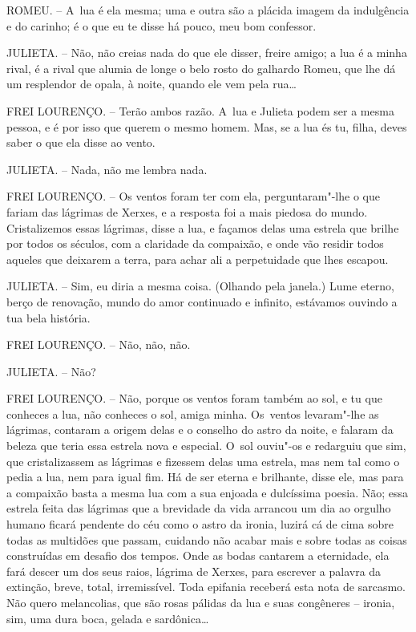 ROMEU. -- A~lua é ela mesma; uma e outra são a plácida imagem da
indulgência e do carinho; é o que eu te disse há pouco, meu bom
confessor.

JULIETA. -- Não, não creias nada do que ele disser, freire amigo; a lua
é a minha rival, é a rival que alumia de longe o belo rosto do galhardo
Romeu, que lhe dá um resplendor de opala, à noite, quando ele vem pela
rua\ldots{}

FREI LOURENÇO. -- Terão ambos razão. A~lua e Julieta podem ser a mesma
pessoa, e é por isso que querem o mesmo homem. Mas, se a lua és tu,
filha, deves saber o que ela disse ao vento.

JULIETA. -- Nada, não me lembra nada.

FREI LOURENÇO. -- Os ventos foram ter com ela, perguntaram"-lhe o que
fariam das lágrimas de Xerxes, e a resposta foi a mais piedosa do mundo.
Cristalizemos essas lágrimas, disse a lua, e façamos delas uma estrela
que brilhe por todos os séculos, com a claridade da compaixão, e onde
vão residir todos aqueles que deixarem a terra, para achar ali a
perpetuidade que lhes escapou.

JULIETA. -- Sim, eu diria a mesma coisa. (Olhando pela janela.) Lume
eterno, berço de renovação, mundo do amor continuado e infinito,
estávamos ouvindo a tua bela história.

FREI LOURENÇO. -- Não, não, não.

JULIETA. -- Não?

FREI LOURENÇO. -- Não, porque os ventos foram também ao sol, e tu que
conheces a lua, não conheces o sol, amiga minha. Os~ventos levaram"-lhe
as lágrimas, contaram a origem delas e o conselho do astro da noite, e
falaram da beleza que teria essa estrela nova e especial. O~sol ouviu"-os
e redarguiu que sim, que cristalizassem as lágrimas e fizessem delas uma
estrela, mas nem tal como o pedia a lua, nem para igual fim. Há de ser
eterna e brilhante, disse ele, mas para a compaixão basta a mesma lua
com a sua enjoada e dulcíssima poesia. Não; essa estrela feita das
lágrimas que a brevidade da vida arrancou um dia ao orgulho humano
ficará pendente do céu como o astro da ironia, luzirá cá de cima sobre
todas as multidões que passam, cuidando não acabar mais e sobre todas as
coisas construídas em desafio dos tempos. Onde as bodas cantarem a
eternidade, ela fará descer um dos seus raios, lágrima de Xerxes, para
escrever a palavra da extinção, breve, total, irremissível. Toda
epifania receberá esta nota de sarcasmo. Não quero melancolias, que são
rosas pálidas da lua e suas congêneres -- ironia, sim, uma dura boca,
gelada e sardônica\ldots{}

